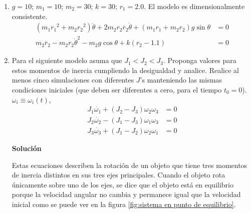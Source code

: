 \documentclass[letterpaper, 12pt]{article}
\begin{document}
\begin{enumerate}
\begin{enumerate}
\item $g = 10$; $m_1 = 10$; $m_2 = 30$; $k = 30$; $r_1 = 2.0$. El modelo es dimensionalmente consistente.
\begin{equation}
\begin{split}
    \left(m_1{r_1}^2 + m_2{r_2}^2\right)\ddot{\theta} + 2m_2r_2\dot{r_2}\dot{\theta} + \left(m_1r_1 + m_2r_2\right)g\sin \theta &= 0 \\
    m_2\ddot{r_2} - m_2r_2{\dot{\theta}}^2 - m_2g\cos \theta + k\left(r_2 - 1.1\right) &= 0
\end{split}
\end{equation}









\item Para el siguiente modelo asuma que $J_1 < J_2 < J_3$. Proponga valores para estos momentos de inercia cumpliendo la desigualdad y analice. Realice al menos cinco simulaciones con diferentes $J$'s manteniendo las mismas condiciones iniciales (que deben ser diferentes a cero, para el tiempo $t_0 = 0$). $\omega_i \equiv \omega_i(t)$,
\begin{equation}
\begin{split}
    J_1\dot{\omega_1} + \left( J_2 - J_3\right)\omega_2\omega_3 &= 0 \\
    J_2\dot{\omega_2} - \left( J_1 - J_3\right)\omega_1\omega_3 &= 0 \\
    J_3\dot{\omega_3} + \left( J_1 - J_2\right)\omega_2\omega_1 &= 0
\end{split}
\end{equation}

\textbf{Solución}

Estas ecuaciones describen la rotación de un objeto que tiene tres momentos de inercia distintos en sus tres ejes principales.
Cuando el objeto rota únicamente sobre uno de los ejes, se dice que el objeto está en equilibrio porque la velocidad angular no cambia y permanece igual que la velocidad inicial como se puede ver en la figura \ref{fig:sistema en punto de equilibrio}.


\end{enumerate}
\end{enumerate}
\end{document}
